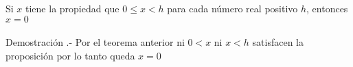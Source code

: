 \begin{teo}
Si $x$ tiene la propiedad que $0\leq x < h$ para cada número real positivo $h$, entonces $x=0$\\\\
Demostración .- \;                                                                                                                                                                                                                                                                                                                                                                                                                                                                                                                                                                                                                                                                                                                               Por el teorema anterior ni $0<x$ ni $x<h$ satisfacen la proposición por lo tanto queda $x=0$\\\\
\end{teo}